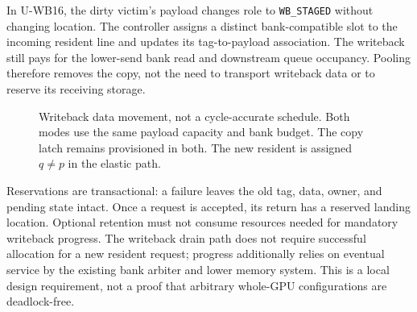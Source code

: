 \documentclass[conference,letterpaper]{IEEEtran}
\newcommand{\unif}{U-WB16}
\begin{document}
In \unif{}, the dirty victim's payload changes role to \texttt{WB\_STAGED} without changing location. The controller assigns a distinct bank-compatible slot to the incoming resident line and updates its tag-to-payload association. The writeback still pays for the lower-send bank read and downstream queue occupancy. Pooling therefore removes the copy, not the need to transport writeback data or to reserve its receiving storage.

\begin{figure}[t]
\centering
{}
\caption{Writeback data movement, not a cycle-accurate schedule. Both modes use the same payload capacity and bank budget. The copy latch remains provisioned in both. The new resident is assigned $q\ne p$ in the elastic path.}
\label{fig:paths}
\end{figure}

Reservations are transactional: a failure leaves the old tag, data, owner, and pending state intact. Once a request is accepted, its return has a reserved landing location. Optional retention must not consume resources needed for mandatory writeback progress. The writeback drain path does not require successful allocation for a new resident request; progress additionally relies on eventual service by the existing bank arbiter and lower memory system. This is a local design requirement, not a proof that arbitrary whole-GPU configurations are deadlock-free.
\end{document}
